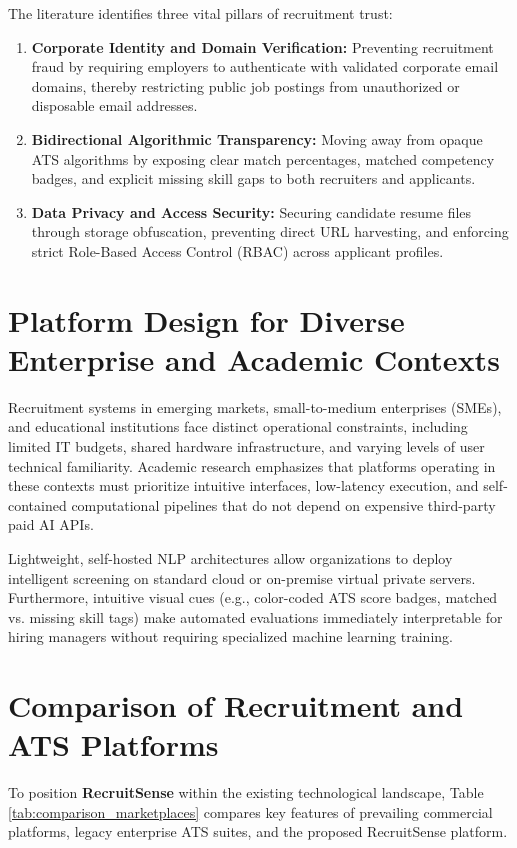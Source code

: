 The literature identifies three vital pillars of recruitment trust:
\begin{enumerate}
    \item \textbf{Corporate Identity and Domain Verification:} Preventing recruitment fraud by requiring employers to authenticate with validated corporate email domains, thereby restricting public job postings from unauthorized or disposable email addresses.
    \item \textbf{Bidirectional Algorithmic Transparency:} Moving away from opaque ATS algorithms by exposing clear match percentages, matched competency badges, and explicit missing skill gaps to both recruiters and applicants.
    \item \textbf{Data Privacy and Access Security:} Securing candidate resume files through storage obfuscation, preventing direct URL harvesting, and enforcing strict Role-Based Access Control (RBAC) across applicant profiles.
\end{enumerate}

\section{Platform Design for Diverse Enterprise and Academic Contexts}
Recruitment systems in emerging markets, small-to-medium enterprises (SMEs), and educational institutions face distinct operational constraints, including limited IT budgets, shared hardware infrastructure, and varying levels of user technical familiarity. Academic research emphasizes that platforms operating in these contexts must prioritize intuitive interfaces, low-latency execution, and self-contained computational pipelines that do not depend on expensive third-party paid AI APIs.

Lightweight, self-hosted NLP architectures allow organizations to deploy intelligent screening on standard cloud or on-premise virtual private servers. Furthermore, intuitive visual cues (e.g., color-coded ATS score badges, matched vs. missing skill tags) make automated evaluations immediately interpretable for hiring managers without requiring specialized machine learning training.

\section{Comparison of Recruitment and ATS Platforms}
To position \textbf{RecruitSense} within the existing technological landscape, Table \ref{tab:comparison_marketplaces} compares key features of prevailing commercial platforms, legacy enterprise ATS suites, and the proposed RecruitSense platform.

